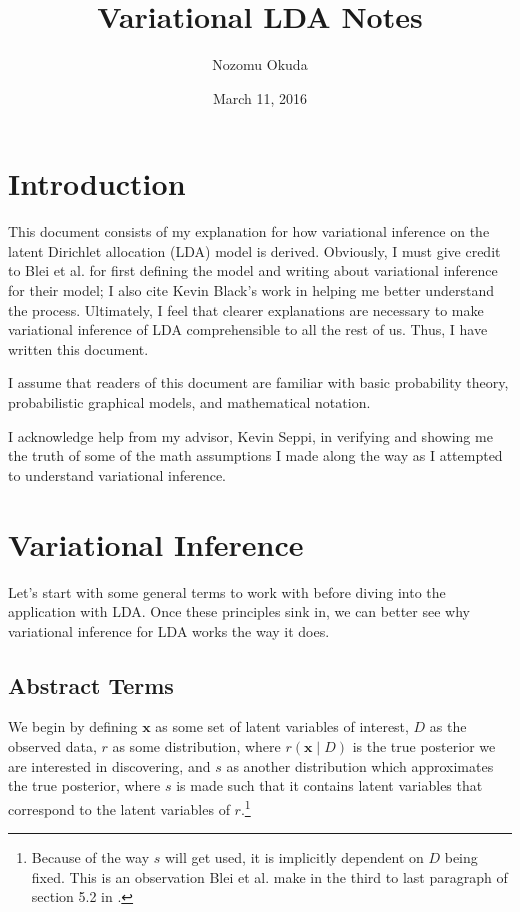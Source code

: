 \documentclass[12pt]{article}
\title{Variational LDA Notes}
\author{Nozomu Okuda}
\date{March 11, 2016}
\begin{document}
\maketitle

\section{Introduction}

This document consists of my explanation for how variational inference on the
latent Dirichlet allocation (LDA) model is derived.  Obviously, I must give
credit to Blei et al.\@ \autocite{Blei:2003:LDA} for first defining the model
and writing about variational inference for their model; I also cite Kevin
Black's work \autocite{kb} in helping me better understand the process.
Ultimately, I feel that clearer explanations are necessary to make variational
inference of LDA comprehensible to all the rest of us.  Thus, I have written
this document.

I assume that readers of this document are familiar with basic probability
theory, probabilistic graphical models, and mathematical notation.

I acknowledge help from my advisor, Kevin Seppi, in verifying and showing me the
truth of some of the math assumptions I made along the way as I attempted to
understand variational inference.

\section{Variational Inference}

Let's start with some general terms to work with before diving into the
application with LDA.  Once these principles sink in, we can better see why
variational inference for LDA works the way it does.

\subsection{Abstract Terms}

We begin by defining $\bm{x}$ as some set of latent variables of interest, $D$
as the observed data, $r$ as some distribution, where $r(\bm{x} \mid D)$ is the
true posterior we are interested in discovering, and $s$ as another distribution
which approximates the true posterior, where $s$ is made such that it contains
latent variables that correspond to the latent variables of $r$.\footnote{
Because of the way $s$ will get used, it is implicitly dependent on $D$ being
fixed.  This is an observation Blei et al. make in the third to last paragraph
of section 5.2 in \autocite{Blei:2003:LDA}.}
\end{document}
